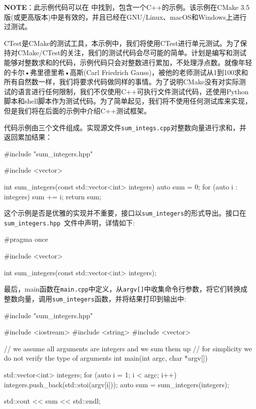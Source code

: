 \begin{myInfoBox}
\textbf{NOTE}：此示例代码可以在  中找到，包含一个C++的示例。该示例在CMake 3.5版(或更高版本)中是有效的，并且已经在GNU/Linux、macOS和Windows上进行过测试。
\end{myInfoBox}

CTest是CMake的测试工具，本示例中，我们将使用CTest进行单元测试。为了保持对CMake/CTest的关注，我们的测试代码会尽可能的简单。计划是编写和测试能够对整数求和的代码，示例代码只会对整数进行累加，不处理浮点数。就像年轻的卡尔•弗里德里希•高斯(Carl Friedrich Gauss)，被他的老师测试从1到100求和所有自然数一样，我们将要求代码做同样的事情。为了说明CMake没有对实际测试的语言进行任何限制，我们不仅使用C++可执行文件测试代码，还使用Python脚本和shell脚本作为测试代码。为了简单起见，我们将不使用任何测试库来实现，但是我们将在后面的示例中介绍C++测试框架。


代码示例由三个文件组成。实现源文件\texttt{sum\_integs.cpp}对整数向量进行求和，并返回累加结果：

\begin{codebox}[cpp]
#include "sum_integers.hpp"

#include <vector>

int sum_integers(const std::vector<int> integers) {
    auto sum = 0;
    for (auto i : integers) {
        sum += i;
    }
    return sum;
}
\end{codebox}

这个示例是否是优雅的实现并不重要，接口以\texttt{sum\_integers}的形式导出。接口在\texttt{ sum\_integers.hpp }文件中声明，详情如下:

\begin{codebox}[cpp]
#pragma once

#include <vector>

int sum_integers(const std::vector<int> integers);
\end{codebox}

最后，main函数在\texttt{main.cpp}中定义，从\texttt{argv[]}中收集命令行参数，将它们转换成整数向量，调用\texttt{sum\_integers}函数，并将结果打印到输出中:

\begin{codebox}[cpp]
#include "sum_integers.hpp"

#include <iostream>
#include <string>
#include <vector>

// we assume all arguments are integers and we sum them up
// for simplicity we do not verify the type of arguments
int main(int argc, char *argv[]) {
    std::vector<int> integers;
    for (auto i = 1; i < argc; i++) {
        integers.push_back(std::stoi(argv[i]));
    }
    auto sum = sum_integers(integers);
  
    std::cout << sum << std::endl;
}
\end{codebox}

